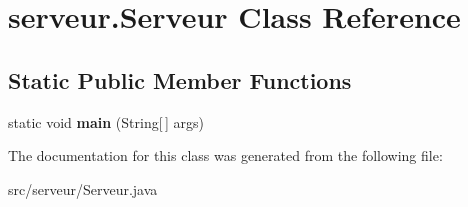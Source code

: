\hypertarget{classserveur_1_1_serveur}{}\section{serveur.\+Serveur Class Reference}
\label{classserveur_1_1_serveur}
\subsection*{Static Public Member Functions}
\begin{DoxyCompactItemize}
\item 
\mbox{\label{classserveur_1_1_serveur_a1cf09998c1efabe4a9db7b454cfcbe69}} 
static void {\bfseries main} (String\mbox{[}$\,$\mbox{]} args)
\end{DoxyCompactItemize}


The documentation for this class was generated from the following file\+:\begin{DoxyCompactItemize}
\item 
src/serveur/Serveur.\+java\end{DoxyCompactItemize}
